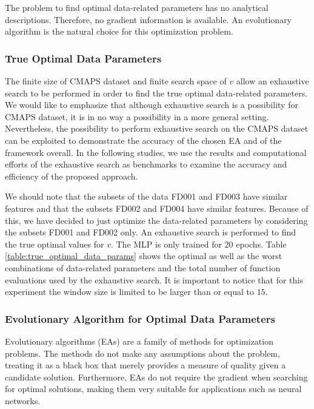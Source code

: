\documentclass[preprint,12pt]{elsarticle}%
\begin{document}
The problem to find optimal data-related parameters has no analytical
descriptions. Therefore, no gradient information is available. An evolutionary
algorithm is the natural choice for this optimization problem.

\subsubsection{True Optimal Data Parameters}

The finite size of CMAPS dataset and finite search space 
of $v$ allow an exhaustive
search to be performed in order to find the true optimal data-related
parameters. We would like to emphasize that although exhaustive search is a
possibility for CMAPS dataset, it is in no way a possibility in a more general
setting. Nevertheless, the possibility to perform exhaustive search on the
CMAPS dataset can be exploited to demonstrate the accuracy of the chosen EA
and of the framework overall. In the following studies, we use the results and
computational efforts of the exhaustive search as benchmarks to examine the
accuracy and efficiency of the proposed approach.

We should note that the subsets of the data FD001 and FD003 have similar
features and that the subsets FD002 and FD004 have similar features. Because
of this, we have decided to just optimize the data-related parameters by
considering the subsets FD001 and FD002 only. An exhaustive search is
performed to find the true optimal values for $v$. 
The MLP is only trained for $20$ epochs. Table
\ref{table:true_optimal_data_params} shows the optimal as well as the worst
combinations of data-related parameters and the total number of function
evaluations used by the exhaustive search. It is important to notice that for 
this experiment the window size is limited to be larger than or equal to $15$.

\subsubsection{Evolutionary Algorithm for Optimal Data Parameters}

\label{sec:ea_optimization_process}

Evolutionary algorithms (EAs) are a family of methods for optimization
problems. The methods do not make any assumptions about the problem, treating
it as a black box that merely provides a measure of quality given a candidate
solution. Furthermore, EAs do not require the gradient when searching for
optimal solutions, making them very suitable for applications such as neural networks.
\end{document}
